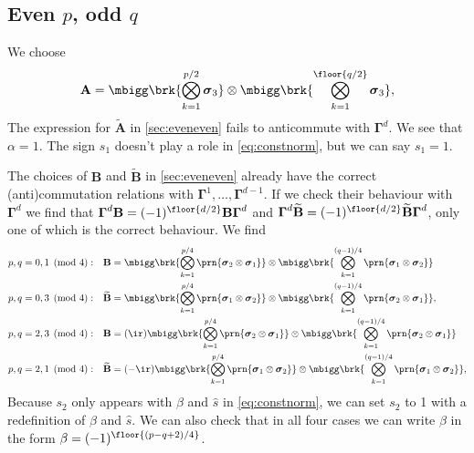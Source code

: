 \documentclass[11pt]{article}
\newcommand{\Gammab}{\boldsymbol{\Gamma}}
\newcommand{\A}{\mathbf{A}}
\newcommand{\B}{\mathbf{B}}
\newcommand{\At}{\widetilde{\A}}
\newcommand{\Bt}{\widetilde{\B}}
\newcommand{\sigmab}{\boldsymbol{\sigma}}
\begin{document}

\subsection{Even \texorpdfstring{$p$}{p}, odd \texorpdfstring{$q$}{q}}\label{sec:evenodd}

We choose
%
\begin{equation*}
  \A =  \mbigg\brk{\bigotimes_{k=1}^{{p/2}} \sigmab_3}
        \otimes \mbigg\brk{\bigotimes_{k=1}^{\floor{q/2}} \sigmab_3},
\end{equation*}
%
The expression for $\At$ in \cref{sec:eveneven} fails to anticommute with $\Gammab^d$.
We see that $\alpha = 1$.
The sign $s_1$ doesn't play a role in \cref{eq:constnorm}, but we can say $s_1 = 1$.

The choices of $\B$ and $\Bt$ in \cref{sec:eveneven} already have the correct (anti)commutation relations with $\Gammab^1, \ldots, \Gammab^{d-1}$.
If we check their behaviour with $\Gammab^d$ we find that $\Gammab^d \B = (-1)^{\floor{d/2}}\B \Gammab^d$ and $\Gammab^d \Bt = (-1)^{\floor{d/2}}\Bt \Gammab^d$, only one of which is the correct behaviour.
We find
%
\begin{equation*}
\begin{aligned}
  p,q &= 0,1 \pmod 4: &
  \B &= \mbigg\brk{\bigotimes_{k=1}^{p/4} \prn{\sigmab_2 \otimes \sigmab_1}} \otimes
        \mbigg\brk{\bigotimes_{k=1}^{(q-1)/4} \prn{\sigmab_1 \otimes \sigmab_2}} \\
  p,q &= 0,3 \pmod 4: &
  \Bt &= \mbigg\brk{\bigotimes_{k=1}^{p/4} \prn{\sigmab_1 \otimes \sigmab_2}} \otimes
        \mbigg\brk{\bigotimes_{k=1}^{(q-1)/4} \prn{\sigmab_2 \otimes \sigmab_1}},
  \\
  p,q &= 2,3 \pmod 4: &
  \B &= (\ir)
        \mbigg\brk{\bigotimes_{k=1}^{p/4} \prn{\sigmab_2 \otimes \sigmab_1}} \otimes
        \mbigg\brk{\bigotimes_{k=1}^{(q-1)/4} \prn{\sigmab_2 \otimes \sigmab_1}} \\
  p,q &= 2,1 \pmod 4: &
  \Bt &= (-\ir)
        \mbigg\brk{\bigotimes_{k=1}^{p/4} \prn{\sigmab_1 \otimes \sigmab_2}} \otimes
        \mbigg\brk{\bigotimes_{k=1}^{(q-1)/4} \prn{\sigmab_1 \otimes \sigmab_2}},
\end{aligned}
\end{equation*}
%
Because $s_2$ only appears with $\beta$ and $\hat{s}$ in \cref{eq:constnorm}, we can set $s_2$ to 1  with a redefinition of $\beta$ and $\hat{s}$.
We can also check that in all four cases we can write $\beta$ in the form $\beta = (-1)^{\floor{(p-q+2)/4}}$.
\end{document}
